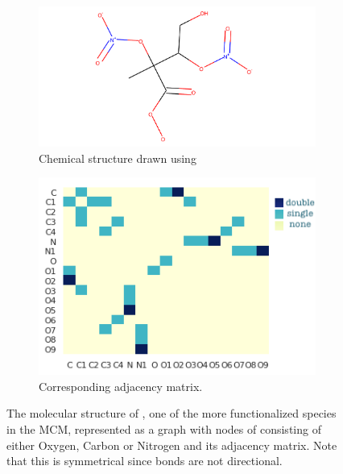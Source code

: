 \begin{figure}[H]
     \centering
     \begin{subfigure}[b]{0.495\textwidth}
         \centering
         \includegraphics[width=\textwidth,height=.8\textwidth]{4fig/INB1NBCO3.pdf}
         \caption{Chemical structure drawn using \citep{rdkit}}
         \label{fig:graphmol}
     \end{subfigure}
     \hfill
     \begin{subfigure}[b]{0.495\textwidth}
         \centering
         \includegraphics[width=\textwidth,height=.8\textwidth]{4fig/INB1NBCO3_adj.png}
         \caption{Corresponding adjacency matrix.}
         \label{fig:adjmol}
     \end{subfigure}

        \caption{ The molecular structure of , one of the more functionalized species in the MCM, represented as a graph with nodes of consisting of either Oxygen, Carbon or Nitrogen and its adjacency matrix. Note that this is symmetrical since bonds are not directional.}
        \label{fig:bondmat}
\end{figure}


